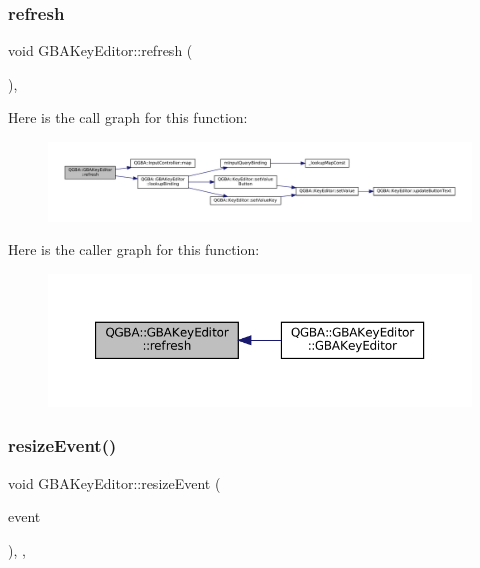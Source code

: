 \subsubsection{\texorpdfstring{refresh}{refresh}}
{\footnotesize\ttfamily void G\+B\+A\+Key\+Editor\+::refresh (\begin{DoxyParamCaption}{ }\end{DoxyParamCaption})\hspace{0.3cm}{\ttfamily [private]}, {\ttfamily [slot]}}

Here is the call graph for this function\+:
\nopagebreak
\begin{figure}[H]
\begin{center}
\leavevmode
\includegraphics[width=350pt]{class_q_g_b_a_1_1_g_b_a_key_editor_ab32fdd08ededd70914682b14b4f4c127_cgraph}
\end{center}
\end{figure}
Here is the caller graph for this function\+:
\nopagebreak
\begin{figure}[H]
\begin{center}
\leavevmode
\includegraphics[width=350pt]{class_q_g_b_a_1_1_g_b_a_key_editor_ab32fdd08ededd70914682b14b4f4c127_icgraph}
\end{center}
\end{figure}
\mbox{\label{class_q_g_b_a_1_1_g_b_a_key_editor_a38f5e33d0c9c1234395c4f3b0a6b0349}} 
\subsubsection{\texorpdfstring{resize\+Event()}{resizeEvent()}}
{\footnotesize\ttfamily void G\+B\+A\+Key\+Editor\+::resize\+Event (\begin{DoxyParamCaption}\item[{Q\+Resize\+Event $\ast$}]{event }\end{DoxyParamCaption})\hspace{0.3cm}{\ttfamily [override]}, {\ttfamily [protected]}, {\ttfamily [virtual]}}

